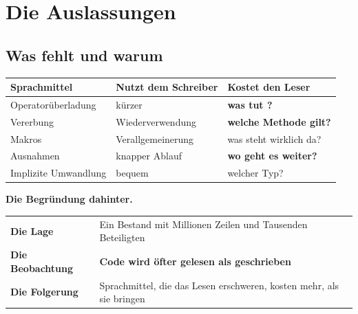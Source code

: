 \part{Die Auslassungen}

\chapter{Was fehlt und warum}\label{kap:auslassungen}

\begin{merksatz}
\begin{center}
{\small
\renewcommand{\arraystretch}{1.5}
\begin{tabular}{@{}P{3.0cm}P{2.8cm}P{2.6cm}@{}}
\toprule
\textbf{Sprachmittel} & \textbf{Nutzt dem Schreiber} & \textbf{Kostet den Leser}\\
\midrule
Operator\-überladung & \textcolor{gruen}{kürzer} & \textcolor{akzent}{\textbf{was tut \code{+}?}}\\
Vererbung & Wiederver\-wendung & \textcolor{akzent}{\textbf{welche Methode gilt?}}\\
Makros & Verallgemei\-nerung & \textcolor{akzent}{was steht wirklich da?}\\
Ausnahmen & \textcolor{gruen}{knapper Ablauf} & \textcolor{akzent}{\textbf{wo geht es weiter?}}\\
Implizite Umwandlung & bequem & \textcolor{akzent}{welcher Typ?}\\
\bottomrule
\end{tabular}}
\end{center}

\begin{center}
\begin{minipage}{0.88\textwidth}
\end{minipage}
\end{center}

\textbf{Die Begründung dahinter.}

\begin{center}
\renewcommand{\arraystretch}{1.5}
\begin{tabular}{@{}P{2.6cm}P{6.4cm}@{}}
\toprule
\textbf{Die Lage} & Ein Bestand mit Millionen Zeilen und Tausenden Beteiligten\\
\textbf{Die Beobachtung} & \textbf{Code wird öfter gelesen als geschrieben}\\
\textbf{Die Folgerung} & Sprachmittel, die das Lesen erschweren, kosten mehr, als sie bringen\\
\bottomrule
\end{tabular}
\end{center}


\end{merksatz}
